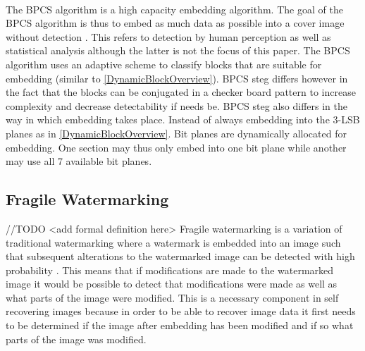 \documentclass[12pt]{article}
\begin{document}
\hspace{0pt} \\
The BPCS algorithm is a high capacity embedding algorithm. The goal of the BPCS algorithm is thus to embed as much data as possible into a cover image without detection \cite{beaullieubpcs}.
This refers to detection by human perception as well as statistical analysis although the latter is not the focus of this paper.
The BPCS algorithm uses an adaptive scheme to classify blocks that are suitable for embedding (similar to \ref{DynamicBlockOverview}).
BPCS steg differs however in the fact that the blocks can be conjugated in a checker board pattern to increase complexity and decrease detectability if needs be.
BPCS steg also differs in the way in which embedding takes place.
Instead of always embedding into the 3-LSB planes as in \ref{DynamicBlockOverview}.
Bit planes are dynamically allocated for embedding.
One section may thus only embed into one bit plane while another may use all 7 available bit planes.

\subsection{Fragile Watermarking}
//TODO <add formal definition here> 
\label{introFragWatermarking}
Fragile watermarking is a variation of traditional watermarking where a watermark is embedded into an image such that subsequent alterations to the watermarked image can be detected with high probability \cite{lin1999review}.
This means that if modifications are made to the watermarked image it would be possible to detect that modifications were made as well as what parts of the image were modified.
This is a necessary component in self recovering images because in order to be able to recover image data it first needs to be determined if the image after embedding has been modified and if so what parts of the image was modified.

\end{document}
